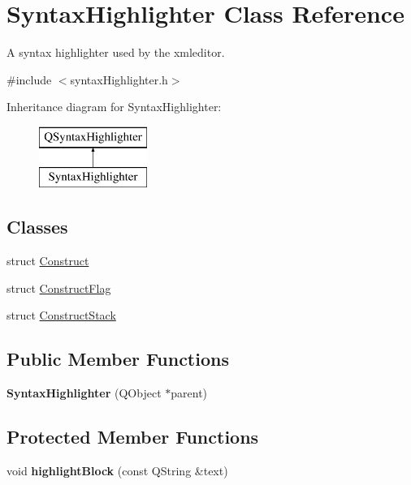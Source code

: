 \hypertarget{class_syntax_highlighter}{\section{Syntax\-Highlighter Class Reference}
\label{class_syntax_highlighter}
}


A syntax highlighter used by the xmleditor.  




{\ttfamily \#include $<$syntax\-Highlighter.\-h$>$}

Inheritance diagram for Syntax\-Highlighter\-:\begin{figure}[H]
\begin{center}
\leavevmode
\includegraphics[height=2.000000cm]{class_syntax_highlighter}
\end{center}
\end{figure}
\subsection*{Classes}
\begin{DoxyCompactItemize}
\item 
struct \hyperlink{struct_syntax_highlighter_1_1_construct}{Construct}
\item 
struct \hyperlink{struct_syntax_highlighter_1_1_construct_flag}{Construct\-Flag}
\item 
struct \hyperlink{struct_syntax_highlighter_1_1_construct_stack}{Construct\-Stack}
\end{DoxyCompactItemize}
\subsection*{Public Member Functions}
\begin{DoxyCompactItemize}
\item 
\hypertarget{class_syntax_highlighter_a63b634aa77cc66e96f0e100d8be26615}{{\bfseries Syntax\-Highlighter} (Q\-Object $\ast$parent)}\label{class_syntax_highlighter_a63b634aa77cc66e96f0e100d8be26615}

\end{DoxyCompactItemize}
\subsection*{Protected Member Functions}
\begin{DoxyCompactItemize}
\item 
\hypertarget{class_syntax_highlighter_a2633163bedde0a890f27d4d47614f1ad}{void {\bfseries highlight\-Block} (const Q\-String \&text)}\label{class_syntax_highlighter_a2633163bedde0a890f27d4d47614f1ad}

\end{DoxyCompactItemize}


